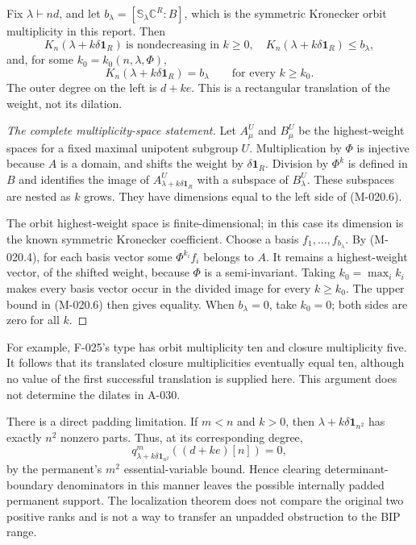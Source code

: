 Fix \(\lambda\vdash nd\), and let
\(b_\lambda=[\mathbb S_\lambda\mathbb C^R:B]\), which is
the symmetric Kronecker orbit multiplicity in this report.
Then
\[
 K_n(\lambda+k\delta\mathbf1_R)
 \ \text{is nondecreasing in }k\geq0,\quad
 K_n(\lambda+k\delta\mathbf1_R)\leq b_\lambda,
                                                               \tag{M-020.6}
\]
and, for some \(k_0=k_0(n,\lambda,\Phi)\),
\[
             K_n(\lambda+k\delta\mathbf1_R)=b_\lambda
                         \qquad\text{for every }k\geq k_0.
                                                               \tag{M-020.7}
\]
The outer degree on the left is \(d+ke\). This is a
rectangular translation of the weight, not its dilation.

\begin{proof}[The complete multiplicity-space statement]
Let \(A^U_\mu\) and \(B^U_\mu\) be the highest-weight spaces
for a fixed maximal unipotent subgroup \(U\). Multiplication
by \(\Phi\) is injective because \(A\) is a domain, and shifts
the weight by \(\delta\mathbf1_R\). Division by \(\Phi^k\)
is defined in \(B\) and identifies the image of
\(A^U_{\lambda+k\delta\mathbf1_R}\) with a subspace of
\(B^U_\lambda\). These subspaces are nested as \(k\) grows.
They have dimensions equal to the left side of (M-020.6).

The orbit highest-weight space is finite-dimensional; in this
case its dimension is the known symmetric Kronecker coefficient.
Choose a basis \(f_1,\ldots,f_{b_\lambda}\). By (M-020.4),
for each basis vector some \(\Phi^{k_i}f_i\) belongs to \(A\).
It remains a highest-weight vector, of the shifted weight,
because \(\Phi\) is a semi-invariant. Taking
\(k_0=\max_i k_i\) makes every basis vector occur in the
divided image for every \(k\geq k_0\). The upper bound in
(M-020.6) then gives equality. When \(b_\lambda=0\), take
\(k_0=0\); both sides are zero for all \(k\).
\end{proof}

For example, F-025's type has orbit multiplicity ten and
closure multiplicity five. It follows that its translated
closure multiplicities eventually equal ten, although no
value of the first successful translation is supplied here.
This argument does not determine the dilates in A-030.

There is a direct padding limitation. If \(m<n\) and \(k>0\),
then \(\lambda+k\delta\mathbf1_{n^2}\) has exactly \(n^2\)
nonzero parts. Thus, at its corresponding degree,
\[
 q^m_{\lambda+k\delta\mathbf1_{n^2}}((d+ke)[n])=0,
                                                               \tag{M-020.8}
\]
by the permanent's \(m^2\) essential-variable bound. Hence
clearing determinant-boundary denominators in this manner
leaves the possible internally padded permanent support.
The localization theorem does not compare the original two
positive ranks and is not a way to transfer an unpadded
obstruction to the BIP range.

